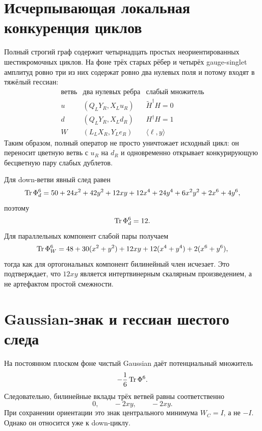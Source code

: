 \section{Исчерпывающая локальная конкуренция циклов}

Полный строгий граф содержит четырнадцать простых неориентированных
шестикромочных циклов. На фоне трёх старых рёбер и четырёх gauge-singlet
амплитуд ровно три из них содержат ровно два нулевых поля и потому входят в
тяжёлый гессиан:
\begin{equation}
\begin{array}{c|c|c}
\text{ветвь}&\text{два нулевых ребра}&\text{слабый множитель}\\ \hline
u&(Q_LY_R,X_Lu_R)&\widetilde H^\dagger H=0\\
d&(Q_LY_R,X_Ld_R)&H^\dagger H=1\\
W&(L_LX_R,Y_Le_R)&\langle\ell,y\rangle
\end{array}
 \label{eq:v7-full-a6-three-quadratic-cycles}
\end{equation}
Таким образом, полный оператор не просто уничтожает исходный цикл: он
переносит цветную ветвь с $u_R$ на $d_R$ и одновременно открывает
конкурирующую бесцветную пару слабых дублетов.

Для down-ветви явный след равен
\begin{equation}
 \operatorname{Tr}\Phi_d^6
 =50+24x^2+42y^2+12xy+12x^4+24y^4
 +6x^2y^2+2x^6+4y^6,
 \label{eq:v7-full-a6-down-polynomial}
\end{equation}
поэтому
\begin{equation}
 [xy]\Tr\Phi_d^6=12.
 \label{eq:v7-full-a6-down-mixed}
\end{equation}
Для параллельных компонент слабой пары получаем
\begin{equation}
 \operatorname{Tr}\Phi_W^6
 =48+30(x^2+y^2)+12xy+12(x^4+y^4)+2(x^6+y^6),
 \label{eq:v7-full-a6-weak-polynomial}
\end{equation}
тогда как для ортогональных компонент билинейный член исчезает. Это
подтверждает, что $12xy$ является интертвинерным скалярным произведением,
а не артефактом простой смежности.

\section{Gaussian-знак и гессиан шестого следа}

На постоянном плоском фоне чистый Gaussian даёт потенциальный множитель
\begin{equation}
 -\frac16\operatorname{Tr}\Phi^6.
 \label{eq:v7-full-a6-gaussian-factor}
\end{equation}
Следовательно, билинейные вклады трёх ветвей равны соответственно
\begin{equation}
 0,\qquad -2xy,\qquad -2xy.
 \label{eq:v7-full-a6-gaussian-mixed-terms}
\end{equation}
При сохранении ориентации это знак центрального минимума $W_C=I$, а не
$-I$. Однако он относится уже к down-циклу.

